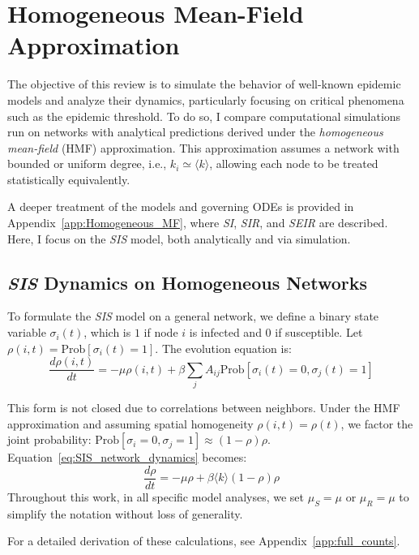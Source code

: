 \section{Homogeneous Mean-Field Approximation}

The objective of this review is to simulate the behavior of well-known epidemic models and analyze their dynamics, particularly focusing on critical phenomena such as the epidemic threshold. To do so, I compare computational simulations run on networks with analytical predictions derived under the \textit{homogeneous mean-field} (HMF) approximation. This approximation assumes a network with bounded or uniform degree, i.e., $k_i \simeq \langle k \rangle$, allowing each node to be treated statistically equivalently.

A deeper treatment of the models and governing ODEs is provided in Appendix~\ref{app:Homogeneous_MF}, where \textit{SI}, \textit{SIR}, and \textit{SEIR} are described. Here, I focus on the \textit{SIS} model, both analytically and via simulation.

\subsection{\textit{SIS} Dynamics on Homogeneous Networks}
To formulate the \textit{SIS} model on a general network, we define a binary state variable $\sigma_i(t)$, which is $1$ if node $i$ is infected and $0$ if susceptible. Let $\rho(i,t) = \text{Prob}[\sigma_i(t) = 1]$. The evolution equation is:
\begin{equation}
\frac{d\rho(i,t)}{dt} = -\mu \rho(i,t) + \beta \sum_j A_{ij} \text{Prob}[\sigma_i(t)=0,\sigma_j(t)=1]
\label{eq:SIS_network_dynamics}
\end{equation}

This form is not closed due to correlations between neighbors. Under the HMF approximation and assuming spatial homogeneity $\rho(i,t) = \rho(t)$, we factor the joint probability: $\text{Prob}[\sigma_i=0,\sigma_j=1] \approx (1-\rho)\rho$. Equation~\eqref{eq:SIS_network_dynamics} becomes:
\begin{equation}
\frac{d\rho}{dt} = -\mu\rho + \beta \langle k \rangle (1 - \rho) \rho
\label{eq:SIS_network_dynamics_hom}
\end{equation}
Throughout this work, in all specific model analyses, we set $\mu_S = \mu$ or $\mu_R = \mu$ to simplify the notation without loss of generality.

For a detailed derivation of these calculations, see Appendix~\ref{app:full_counts}.

